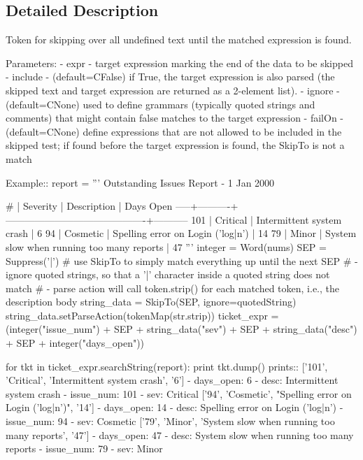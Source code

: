 \subsection{Detailed Description}
\begin{DoxyVerb}Token for skipping over all undefined text until the matched expression is found.

Parameters:
 - expr - target expression marking the end of the data to be skipped
 - include - (default=C{False}) if True, the target expression is also parsed 
      (the skipped text and target expression are returned as a 2-element list).
 - ignore - (default=C{None}) used to define grammars (typically quoted strings and 
      comments) that might contain false matches to the target expression
 - failOn - (default=C{None}) define expressions that are not allowed to be 
      included in the skipped test; if found before the target expression is found, 
      the SkipTo is not a match

Example::
    report = '''
        Outstanding Issues Report - 1 Jan 2000

           # | Severity | Description                               |  Days Open
        -----+----------+-------------------------------------------+-----------
         101 | Critical | Intermittent system crash                 |          6
          94 | Cosmetic | Spelling error on Login ('log|n')         |         14
          79 | Minor    | System slow when running too many reports |         47
        '''
    integer = Word(nums)
    SEP = Suppress('|')
    # use SkipTo to simply match everything up until the next SEP
    # - ignore quoted strings, so that a '|' character inside a quoted string does not match
    # - parse action will call token.strip() for each matched token, i.e., the description body
    string_data = SkipTo(SEP, ignore=quotedString)
    string_data.setParseAction(tokenMap(str.strip))
    ticket_expr = (integer("issue_num") + SEP 
                  + string_data("sev") + SEP 
                  + string_data("desc") + SEP 
                  + integer("days_open"))
    
    for tkt in ticket_expr.searchString(report):
        print tkt.dump()
prints::
    ['101', 'Critical', 'Intermittent system crash', '6']
    - days_open: 6
    - desc: Intermittent system crash
    - issue_num: 101
    - sev: Critical
    ['94', 'Cosmetic', "Spelling error on Login ('log|n')", '14']
    - days_open: 14
    - desc: Spelling error on Login ('log|n')
    - issue_num: 94
    - sev: Cosmetic
    ['79', 'Minor', 'System slow when running too many reports', '47']
    - days_open: 47
    - desc: System slow when running too many reports
    - issue_num: 79
    - sev: Minor
\end{DoxyVerb}
 

